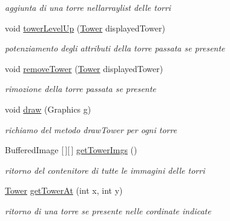 \begin{DoxyCompactItemize}
\begin{DoxyCompactList}\small\item\em aggiunta di una torre nell\textquotesingle{}arraylist delle torri \end{DoxyCompactList}\item 
void \hyperlink{classmanagers_1_1_tower_manager_a8a3c715fcfd3d65e1d8241a1fa4965ff}{tower\+Level\+Up} (\hyperlink{classtowers_1_1_tower}{Tower} displayed\+Tower)
\begin{DoxyCompactList}\small\item\em potenziamento degli attributi della torre passata se presente \end{DoxyCompactList}\item 
void \hyperlink{classmanagers_1_1_tower_manager_addba85b44e35a186e066b2e801f433c4}{remove\+Tower} (\hyperlink{classtowers_1_1_tower}{Tower} displayed\+Tower)
\begin{DoxyCompactList}\small\item\em rimozione della torre passata se presente \end{DoxyCompactList}\item 
void \hyperlink{classmanagers_1_1_tower_manager_a72fe1ffca978e99fd16994a10e7f8051}{draw} (Graphics g)
\begin{DoxyCompactList}\small\item\em richiamo del metodo draw\+Tower per ogni torre \end{DoxyCompactList}\item 
Buffered\+Image \mbox{[}$\,$\mbox{]}\mbox{[}$\,$\mbox{]} \hyperlink{classmanagers_1_1_tower_manager_aeae3bb8b35e0507fe9105c2eb4713339}{get\+Tower\+Imgs} ()
\begin{DoxyCompactList}\small\item\em ritorno del contenitore di tutte le immagini delle torri \end{DoxyCompactList}\item 
\hyperlink{classtowers_1_1_tower}{Tower} \hyperlink{classmanagers_1_1_tower_manager_a4345f2e80059788e5ab1dd1cf0ff2c04}{get\+Tower\+At} (int x, int y)
\begin{DoxyCompactList}\small\item\em ritorno di una torre se presente nelle cordinate indicate \end{DoxyCompactList}\end{DoxyCompactItemize}

